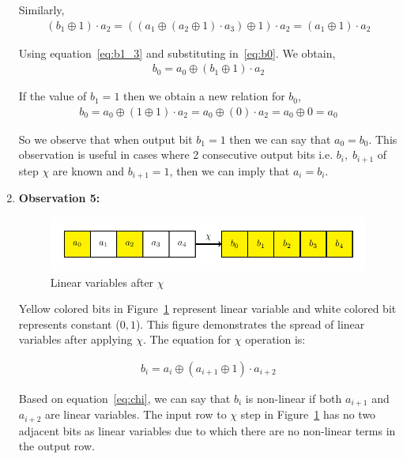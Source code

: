 \begin{enumerate}
Similarly,
\begin{align}\label{eq:b1_3}
\left(b_1 \oplus 1 \right) \cdot a_2 = \left( \left( a_1 \oplus \left( a_2 \oplus 1 \right) \cdot a_3 \right) \oplus 1 \right) \cdot a_2 = \left( a_1 \oplus 1 \right) \cdot a_2
\end{align}

Using equation~\ref{eq:b1_3} and substituting in~\ref{eq:b0}. We obtain,
\begin{align}\label{eq:b0_2}
b_0 = a_0 \oplus \left( b_1 \oplus 1 \right) \cdot a_2
\end{align}

If the value of $b_1 = 1$ then we obtain a new relation for $b_0$,
\begin{align}\label{eq:b0_3}
b_0 = a_0 \oplus \left( 1 \oplus 1 \right) \cdot a_2 = a_0 \oplus \left( 0 \right) \cdot a_2 = a_0 \oplus 0 = a_0
\end{align}

So we observe that when output bit $b_1 = 1$ then we can say that $a_0 = b_0$. This observation is useful in cases where 2 consecutive output bits i.e. $b_i, \; b_{i+1}$ of step $\chi$ are known and $b_{i+1} = 1$, then we can imply that $a_i = b_i$.

\item \label{ob5}\textbf{Observation 5:}
\begin{figure}[H]
	\centering
	\includegraphics{chistep.pdf}
	\caption{Linear variables after $\chi$}
	\label{fig:chistep}
\end{figure}

Yellow colored bits in Figure~\ref{fig:chistep} represent linear variable and white colored bit represents constant ($0, 1$). This figure demonstrates the spread of linear variables after applying $\chi$. The equation for $\chi$ operation is:

\begin{align}\label{eq:chi}
b_i = a_i \oplus \left( a_{i+1} \oplus 1 \right) \cdot a_{i+2}
\end{align}

Based on equation~\ref{eq:chi}, we can say that $b_i$ is non-linear if both $a_{i+1}$ and $a_{i+2}$ are linear variables. The input row to $\chi$ step in Figure~\ref{fig:chistep} has no two adjacent bits as linear variables due to which there are no non-linear terms in the output row.

\end{enumerate}
